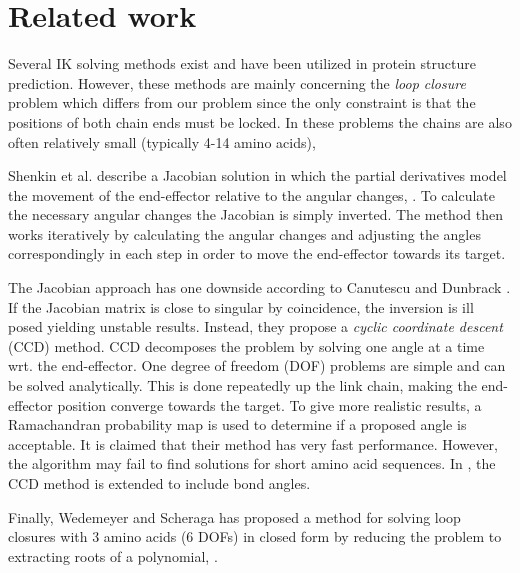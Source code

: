 

\section{Related work}
Several IK solving methods exist and have been utilized in protein
structure prediction.  However, these methods are mainly concerning
the \emph{loop closure} problem \cite{coutsias2004kinematic} which
differs from our problem since the only constraint is that the
positions of both chain ends must be locked. In these problems the
chains are also often relatively small (typically 4-14 amino acids),

  
Shenkin et al. describe a Jacobian solution in which the partial derivatives model the movement of the end-effector relative to the angular changes, \cite{shenkin1987}.
To calculate the necessary angular changes the Jacobian is simply inverted.
The method then works iteratively by calculating the angular changes and adjusting the angles correspondingly in each step in order to move the end-effector towards its target.

The Jacobian approach has one downside according to Canutescu and Dunbrack
\cite{canutescu2003}.
If the Jacobian matrix is close to singular by coincidence, the inversion is ill posed yielding unstable results.
Instead, they propose a \emph{cyclic coordinate descent} (CCD) method.
CCD decomposes the problem by solving one angle at a time wrt. the end-effector.
One degree of freedom (DOF) problems are simple and can be solved analytically.
This is done repeatedly up the link chain, making the end-effector position converge towards the target.
To give more realistic results, a Ramachandran probability map is used to determine if a proposed angle is acceptable. 
It is claimed that their method has very fast performance. 
However, the algorithm may fail to find solutions for short amino acid sequences.
In \cite{boomsma2005full}, the CCD method is extended to include bond angles.

Finally, Wedemeyer and Scheraga has proposed a method for solving loop closures with 3 amino acids (6 DOFs) in closed form by reducing the problem to extracting roots of a polynomial, \cite{wedemeyer1999exact}.


